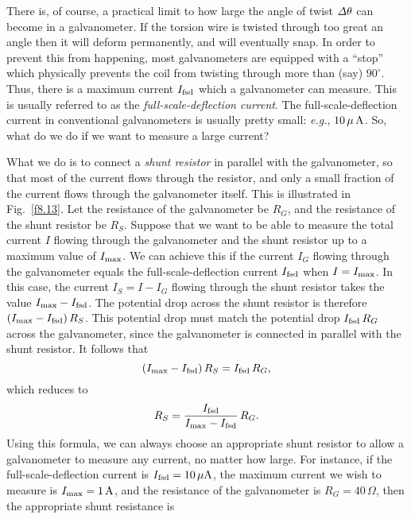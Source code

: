 There is, of course, a practical limit to how large the angle of twist  ${\mit\Delta}\theta$ can become in a galvanometer. If the torsion wire is twisted through
too great an angle
then it will deform permanently, and will eventually snap. 
In order to prevent this from happening, most galvanometers are equipped
with a ``stop'' which physically prevents the coil from twisting through more than
(say) $90^\circ$. Thus, there is a maximum current $I_{\rm fsd}$ which
a galvanometer can measure. This is usually referred to as the
{\em full-scale-deflection current}. The full-scale-deflection current in
 conventional galvanometers is usually pretty small: {\em e.g.}, $10\,\mu\,{\rm A}$. 
So, what do we do if we want to measure a large current?

What we do is to connect a {\em shunt resistor}\/ in parallel with the
galvanometer, so that most of the current flows through the resistor, and
only a small fraction of the current flows through the galvanometer itself. This is
illustrated in Fig.~\ref{f8.13}. Let the resistance of the galvanometer
be $R_G$, and the resistance of the shunt resistor be $R_S$. Suppose that
we want to be able to measure the total current $I$ flowing through the galvanometer
and the shunt resistor up to a maximum value of $I_{\rm max}$. 
We can achieve this if the current $I_G$ flowing through the galvanometer equals the
full-scale-deflection current $I_{\rm fsd}$ when $I=I_{\rm max}$. In this
case, the current $I_S= I-I_G$ flowing through the shunt resistor takes the
value $I_{\rm max}-I_{\rm fsd}$. The potential drop across the shunt resistor is
therefore $(I_{\rm max}-I_{\rm fsd})\,R_S$. This potential drop must match the
potential drop $I_{\rm fsd}\,R_G$ across the galvanometer, since the galvanometer is
connected in parallel with the shunt resistor. It follows that
\begin{equation}
(I_{\rm max}-I_{\rm fsd})\,R_S = I_{\rm fsd}\,R_G,
\end{equation}
which reduces to
\begin{equation}
R_S = \frac{I_{\rm fsd}}{I_{\rm max}-I_{\rm fsd}}\,R_G.
\end{equation}
Using this formula, we can always choose an appropriate shunt resistor to allow
a galvanometer to measure any current, no matter how large. For instance, if
the full-scale-deflection current is $I_{\rm fsd}=10\,\mu{\rm A}$, the maximum current
we wish to measure is $I_{\rm max} = 1\,{\rm A}$, and the resistance of
the galvanometer is $R_G = 40\,\Omega$, then the appropriate shunt resistance is
